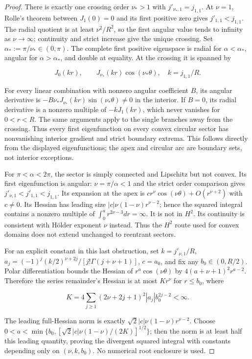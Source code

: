 \documentclass[11pt]{article}
\theoremstyle{definition}
\theoremstyle{remark}
\numberwithin{equation}{section}
\begin{document}
\begin{proof}
There is exactly one crossing order $\nu_*>1$ with $j'_{\nu_*,1}=j_{1,1}$. At $\nu=1$, Rolle's theorem between $J_1(0)=0$ and its first positive zero gives $j'_{1,1}<j_{1,1}$. The radial quotient is at least $\nu^2/R^2$, so the first angular value tends to infinity as $\nu\to\infty$; continuity and strict increase give the unique crossing. Set $\alpha_*:=\pi/\nu_*\in(0,\pi)$. The complete first positive eigenspace is radial for $\alpha<\alpha_*$, angular for $\alpha>\alpha_*$, and double at equality. At the crossing it is spanned by

\begin{equation}\label{eq:src-9-03}
J_0(kr),\qquad J_{\nu_*}(kr)\cos(\nu_*\theta),\quad k=j_{1,1}/R.
\end{equation}

For every linear combination with nonzero angular coefficient $B$, its angular derivative is $-B\nu_*J_{\nu_*}(kr)\sin(\nu_*\theta)\ne0$ in the interior. If $B=0$, its radial derivative is a nonzero multiple of $-kJ_1(kr)$, which never vanishes for $0<r<R$. The same arguments apply to the single branches away from the crossing. Thus every first eigenfunction on every convex circular sector has nonvanishing interior gradient and strict boundary extrema. This follows directly from the displayed eigenfunctions; the apex and circular arc are boundary sets, not interior exceptions.

For $\pi<\alpha<2\pi$, the sector is simply connected and Lipschitz but not convex. Its first eigenfunction is angular: $\nu=\pi/\alpha<1$ and the strict order comparison gives $j'_{\nu,1}<j'_{1,1}<j_{1,1}$. Its expansion at the apex is $c r^\nu\cos(\nu\theta)+O(r^{\nu+2})$ with $c\ne0$. Its Hessian has leading size $|c|\nu(1-\nu)r^{\nu-2}$; hence the squared integral contains a nonzero multiple of $\int_0^a r^{2\nu-3}dr=\infty$. It is not in $H^2$. Its continuity is consistent with H\"older exponent $\nu$ instead. Thus the $H^2$ route used for convex domains does not extend unchanged to reentrant sectors.

For an explicit constant in this last obstruction, set $k=j'_{\nu,1}/R$, $a_j=(-1)^j(k/2)^{\nu+2j}/[j!\Gamma(j+\nu+1)]$, $c=a_0$, and fix any $b_0\in(0,R/2)$. Polar differentiation bounds the Hessian of $r^a\cos(\nu\theta)$ by $4(a+\nu+1)^2r^{a-2}$. Therefore the series remainder's Hessian is at most $Kr^\nu$ for $r\le b_0$, where

\begin{equation}\label{eq:src-9-04}
K=4\sum_{j\ge1}(2\nu+2j+1)^2|a_j|b_0^{2j-2}<\infty.
\end{equation}

The leading full-Hessian norm is exactly $\sqrt2|c|\nu(1-\nu)r^{\nu-2}$. Choose $0<a<\min\{b_0,[\sqrt2|c|\nu(1-\nu)/(2K)]^{1/2}\}$; then the norm is at least half this leading quantity, proving the divergent squared integral with constants depending only on $(\nu,k,b_0)$. No numerical root enclosure is used.
\end{proof}
\end{document}
